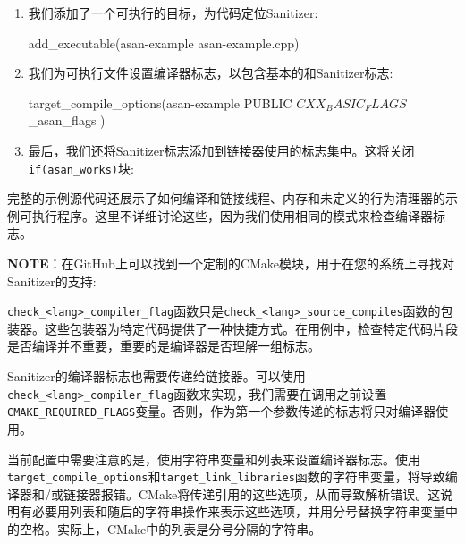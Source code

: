\begin{enumerate}
\item 我们添加了一个可执行的目标，为代码定位Sanitizer:

\begin{codebox}[cmake]
add_executable(asan-example asan-example.cpp)
\end{codebox}

\item 我们为可执行文件设置编译器标志，以包含基本的和Sanitizer标志:

\begin{codebox}[cmake]
target_compile_options(asan-example
  PUBLIC
    ${CXX_BASIC_FLAGS}
    ${_asan_flags}
  )
\end{codebox}

\item 最后，我们还将Sanitizer标志添加到链接器使用的标志集中。这将关闭\texttt{if(asan\_works)}块:


\end{enumerate}

完整的示例源代码还展示了如何编译和链接线程、内存和未定义的行为清理器的示例可执行程序。这里不详细讨论这些，因为我们使用相同的模式来检查编译器标志。

\begin{myInfoBox}
\textbf{NOTE}：在GitHub上可以找到一个定制的CMake模块，用于在您的系统上寻找对Sanitizer的支持:
\end{myInfoBox}


\texttt{check\_<lang>\_compiler\_flag}函数只是\texttt{check\_<lang>\_source\_compiles}函数的包装器。这些包装器为特定代码提供了一种快捷方式。在用例中，检查特定代码片段是否编译并不重要，重要的是编译器是否理解一组标志。

Sanitizer的编译器标志也需要传递给链接器。可以使用\texttt{check\_<lang>\_compiler\_flag}函数来实现，我们需要在调用之前设置\texttt{CMAKE\_REQUIRED\_FLAGS}变量。否则，作为第一个参数传递的标志将只对编译器使用。

当前配置中需要注意的是，使用字符串变量和列表来设置编译器标志。使用\texttt{target\_compile\_options}和\texttt{target\_link\_libraries}函数的字符串变量，将导致编译器和/或链接器报错。CMake将传递引用的这些选项，从而导致解析错误。这说明有必要用列表和随后的字符串操作来表示这些选项，并用分号替换字符串变量中的空格。实际上，CMake中的列表是分号分隔的字符串。

